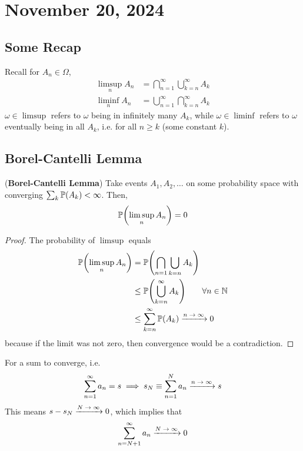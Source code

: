 \section{November 20, 2024}

\subsection{Some Recap}
Recall for $A_n \in \Omega$,
\begin{align}
    \limsup_n A_n &= \bigcap_{n=1}^\infty \bigcup_{k=n}^\infty A_k \\
    \liminf_n A_n &= \bigcup_{n=1}^\infty \bigcap_{k=n}^\infty A_k
\end{align}
$\omega \in \limsup$ refers to $\omega$ being in infinitely many $A_k$, while $\omega \in \liminf$ refers to $\omega$ eventually being in all $A_k$, i.e. for all $n \ge k$ (some constant $k$).


\subsection{Borel-Cantelli Lemma}
\begin{theorem}
    (\textbf{Borel-Cantelli Lemma}) Take events $A_1, A_2, \ldots$ on some probability space with converging $\sum_k \mathbb{P}(A_k) < \infty$. Then,
    \begin{align}
        \mathbb{P}\qty(\limsup_n A_n) = 0
    \end{align}
\end{theorem}

\begin{proof}
    The probability of $\limsup$ equals
    \begin{align}
        \probability\qty(\limsup_n A_n) &= \probability\qty(\bigcap_{n=1} \bigcup_{k=n} A_k)\\
        &\le \probability\qty(\bigcup_{k=n}^\infty A_k) \qsp \forall n \in \natural\\
        &\le \sum_{k=n}^\infty \probability(A_k) \ce{->[$n\to\infty$]} 0
    \end{align}
    because if the limit was not zero, then convergence would be a contradiction.
\end{proof}

\begin{aside}
    For a sum to converge, i.e.
    \begin{align}
        \sum_{n=1}^\infty a_n = s \implies s_N \equiv \sum_{n=1}^N a_n \ce{->[$n\to\infty$]} s
    \end{align}
    This means $s - s_N \ce{->[$N\to\infty$]} 0$, which implies that
    \begin{align}
        \sum_{n = N+1}^\infty a_n \ce{->[$N \to\infty$]} 0
    \end{align}
\end{aside}

